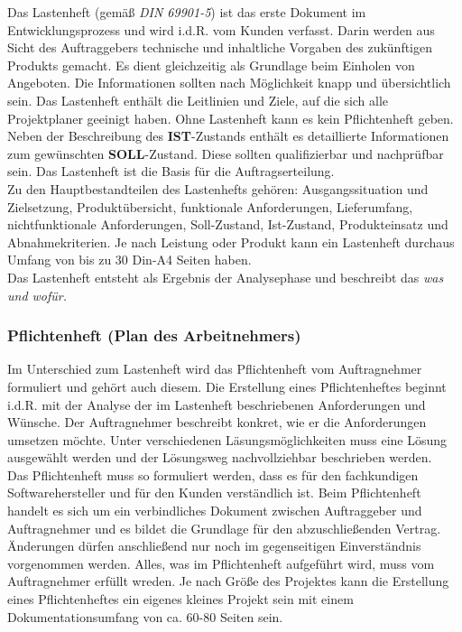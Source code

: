 \documentclass[a4paper, 12pt]{report}
\begin{document}
\begin{multicols}{2}
Das Lastenheft (gemäß \emph{DIN 69901-5}) ist das erste Dokument im
Entwicklungsprozess und wird i.d.R. vom Kunden verfasst. Darin werden aus Sicht
des Auftraggebers technische und inhaltliche Vorgaben des zukünftigen Produkts
gemacht. Es dient gleichzeitig als Grundlage beim Einholen von Angeboten. Die
Informationen sollten nach Möglichkeit knapp und übersichtlich sein. Das
Lastenheft enthält die Leitlinien und Ziele, auf die sich alle Projektplaner
geeinigt haben. Ohne Lastenheft kann es kein Pflichtenheft geben. Neben der
Beschreibung des \textbf{IST}-Zustands enthält es detaillierte Informationen zum
gewünschten \textbf{SOLL}-Zustand. Diese sollten qualifizierbar und nachprüfbar
sein. Das Lastenheft ist die Basis für die Auftragserteilung. \\

Zu den Hauptbestandteilen des Lastenhefts gehören: Ausgangssituation und
Zielsetzung, Produktübersicht, funktionale Anforderungen, Lieferumfang,
nichtfunktionale Anforderungen, Soll-Zustand, Ist-Zustand, Produkteinsatz und
Abnahmekriterien. Je nach Leistung oder Produkt kann ein Lastenheft durchaus
Umfang von bis zu 30 Din-A4 Seiten haben. \\

Das Lastenheft entsteht als Ergebnis der Analysephase und beschreibt das \emph{
was und wofür.}

\subsubsection{Pflichtenheft (Plan des Arbeitnehmers)}

Im Unterschied zum Lastenheft wird das Pflichtenheft vom Auftragnehmer
formuliert und gehört auch diesem. Die Erstellung eines Pflichtenheftes beginnt
i.d.R. mit der Analyse der im Lastenheft beschriebenen Anforderungen und
Wünsche. Der Auftragnehmer beschreibt konkret, wie er die Anforderungen umsetzen
möchte. Unter verschiedenen Läsungsmöglichkeiten muss eine Lösung ausgewählt
werden und der Lösungsweg nachvollziehbar beschrieben werden. \\

Das Pflichtenheft muss so formuliert werden, dass es für den fachkundigen
Softwarehersteller und für den Kunden verständlich ist. Beim Pflichtenheft
handelt es sich um ein verbindliches Dokument zwischen Auftraggeber und
Auftragnehmer und es bildet die Grundlage für den abzuschließenden Vertrag.
Änderungen dürfen anschließend nur noch im gegenseitigen Einverständnis
vorgenommen werden. Alles, was im Pflichtenheft aufgeführt wird, muss vom
Auftragnehmer erfüllt wreden. Je nach Größe des Projektes kann die Erstellung
eines Pflichtenheftes ein eigenes kleines Projekt sein mit einem
Dokumentationsumfang von ca. 60-80 Seiten sein. \\


\end{multicols}
\end{document}
